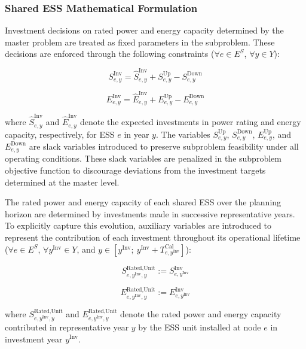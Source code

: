 \documentclass[preprint,12pt]{elsarticle}
\begin{document}
\subsubsection{Shared ESS Mathematical Formulation}

Investment decisions on rated power and energy capacity determined by the master problem are treated as fixed parameters in the subproblem. These decisions are enforced through the following constraints ($\forall e \in E^S$, $\forall y \in Y$):

\begin{equation}
    S^{\text{Inv}}_{e,y} = \hat{S}^{\text{Inv}}_{e,y} + S^{\text{Up}}_{e,y} - S^{\text{Down}}_{e,y}
\end{equation}

\begin{equation}
    E^{\text{Inv}}_{e,y} = \hat{E}^{\text{Inv}}_{e,y} + E^{\text{Up}}_{e,y} - E^{\text{Down}}_{e,y}
\end{equation}

\noindent
where 
$\hat{S}^{\text{Inv}}_{e,y}$ and $\hat{E}^{\text{Inv}}_{e,y}$ denote the expected investments in power rating and energy capacity, respectively, for ESS $e$ in year $y$. 
The variables $S^{\text{Up}}_{e,y}$, $S^{\text{Down}}_{e,y}$, $E^{\text{Up}}_{e,y}$, and $E^{\text{Down}}_{e,y}$ are slack variables introduced to preserve subproblem feasibility under all operating conditions. These slack variables are penalized in the subproblem objective function to discourage deviations from the investment targets determined at the master level.

The rated power and energy capacity of each shared ESS over the planning horizon are determined by investments made in successive representative years. To explicitly capture this evolution, auxiliary variables are introduced to represent the contribution of each investment throughout its operational lifetime ($\forall e \in E^S$, $\forall y^\text{Inv} \in Y$, and $y \in [y^\text{Inv};~y^\text{Inv}+T^\text{Cal}_{e,y^\text{Inv}}]$):

\begin{equation}
    S^{\text{Rated,Unit}}_{e,y^\text{Inv},y} := S^{\text{Inv}}_{e,y^\text{Inv}}
\end{equation}

\begin{equation}
    E^{\text{Rated,Unit}}_{e,y^\text{Inv},y} := E^{\text{Inv}}_{e,y^\text{Inv}}
\end{equation}

\noindent
where 
$S^{\text{Rated,Unit}}_{e,y^\text{Inv},y}$ and $E^{\text{Rated,Unit}}_{e,y^\text{Inv},y}$ denote the rated power and energy capacity contributed in representative year $y$ by the ESS unit installed at node $e$ in investment year $y^\text{Inv}$.
\end{document}
